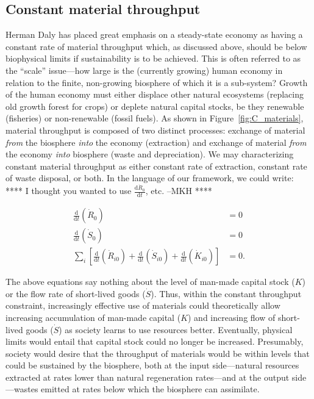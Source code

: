 \subsection{Constant material throughput}

Herman Daly has placed great emphasis on a steady-state
economy as having a constant rate of material throughput 
\cite{Daly1977, Daly1997}
which, as discussed above, should be below biophysical limits
if sustainability is to be achieved.
This is often referred to as the ``scale'' issue---how 
large is the (currently growing) human economy in relation
to the finite, non-growing biosphere of which it is a sub-system?
Growth of the human economy must either displace other natural
ecosystems (replacing old growth forest for crops)
or deplete natural capital stocks, be they 
renewable (fisheries) or 
non-renewable (fossil fuels).
As shown in Figure~\ref{fig:C_materials},
material throughput is composed of two distinct processes:
exchange of material \emph{from} the biosphere 
\emph{into} the economy (extraction)
and exchange of material \emph{from} the economy
\emph{into} biosphere (waste and depreciation).
We may characterizing constant material throughput
as either constant rate of extraction, constant rate of
waste disposal, or both.
In the language of our framework, we could write:
**** I thought you wanted to use $\frac{\mathrm{d}\dot{R}_{0}}{\mathrm{d}t}$, etc. --MKH ****

\begin{align}\label{eq:const_throughput}
	\frac{\mathrm{d}}{\mathrm{d}t}\left(\dot{R}_{0}\right)		&
	= 0																							\\
	\frac{\mathrm{d}}{\mathrm{d}t}\left(\dot{S}_{0}\right)		&
	= 0																						\\
	\sum\limits_{i}
			\left[
				\frac{\mathrm{d}}{\mathrm{d}t}\left(\dot{R}_{i0}\right)
				+ \frac{\mathrm{d}}{\mathrm{d}t}\left(\dot{S}_{i0}\right)
				+ \frac{\mathrm{d}}{\mathrm{d}t}\left(\dot{K}_{i0}\right)
			\right]																			&
	= 0.
\end{align}

The above equations say nothing about the level 
of man-made capital stock ($K$)
or the flow rate of short-lived goods ($\dot{S}$).
Thus, within the constant throughput constraint,
increasingly effective use of materials could
theoretically allow increasing accumulation
of man-made capital ($K$) 
and increasing flow of short-lived goods ($\dot{S}$)
as society learns to use resources better.
Eventually,
physical limits would entail that capital
stock could no longer be increased.
Presumably,
society would desire that the throughput of
materials would be within levels that could
be sustained by the biosphere,
both at the input side---natural 
resources extracted at rates lower
than natural regeneration rates---and 
at the output side---wastes emitted 
at rates below which
the biosphere can assimilate.


